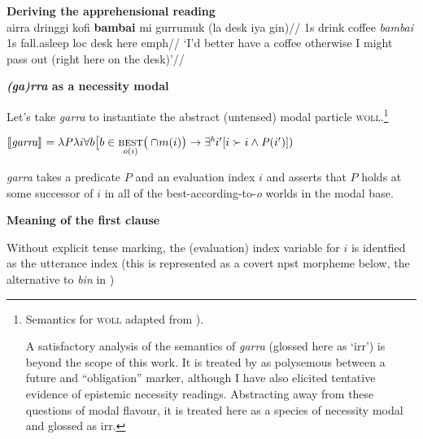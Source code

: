 \pex{}\textbf{Deriving the apprehensional reading}\\
\begingl
\gla ai\textdblhyphen{}rra dringgi kofi \textbf{bambai} mi gurrumuk (la desk iya gin)//
\glb 1s drink coffee \textit{bambai} 1s fall.asleep {\sc loc} desk here {\sc emph}//
\glft `I'd better have a coffee otherwise I might pass out (right here on the desk)'\trailingcitation{[GT~28052016]}//\endgl

\a \textbf{\textit{(ga)rra} as a necessity modal}

Let's take \textit{garra} to instantiate the abstract (untensed) modal particle \textsc{woll}.\footnote{Semantics for \textsc{woll} adapted from \citet[71]{Condoravdi2002}).
	
	A satisfactory analysis of the semantics of \textit{garra} (glossed here as `\gls{irr}') is beyond the scope of this work. It is treated by \cite{Schultze-Berndt} as polysemous between a future and ``obligation'' marker, although I have also elicited tentative evidence of epistemic necessity readings. Abstracting away from these questions of modal flavour, it is treated here as a species of necessity modal and glossed as \gls{irr}.}

$ \llbracket{\textit{garra}}\rrbracket^{} =\lambda\mathit P\lambda i\forall b\big[b\in\underset{o(i)}{\textsc{best}}\big(\cap\!m(i)\big)\to\exists ^bi'[i\succ i\wedge\mathit P(i')])$

\textit{garra} takes a predicate $ \textit{P} $ and an evaluation index $ i $ and asserts that $ \textit{P} $ holds at some successor of $ i $ in all of the best-according-to-\textit{o} worlds in the modal base.



\a \textbf{Meaning of the first clause} 

Without explicit tense marking, the (evaluation) index variable for $ i $ is identfied as the utterance index (this is represented as a covert \gls{npst} morpheme below, the alternative to \textit{bin} in )


